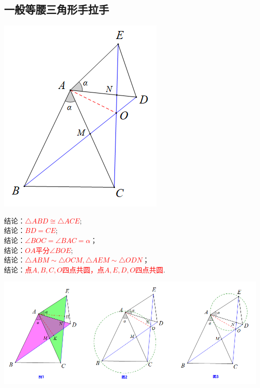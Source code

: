 \documentclass[10pt]{ctexart}
\begin{document}
\subsection{一般等腰三角形手拉手}
\begin{minipage}{0.4\textwidth}
\includegraphics[scale=0.6]{figure/shoulashou01}
\end{minipage}
\begin{minipage}{0.6\textwidth}
  结论：\textcolor{red}{$\triangle ABD\cong \triangle ACE$};\\
  结论：\textcolor{red}{$BD=CE$};\\
  结论：\textcolor{red}{$\angle BOC=\angle BAC=\alpha$}；\\
  结论：\textcolor{red}{$OA$平分$\angle BOE$};\\
  结论：\textcolor{red}{$\triangle ABM\sim \triangle OCM,\triangle AEM\sim \triangle ODN$}；\\
   结论：\textcolor{red}{点$A,B,C,O$四点共圆，点$A,E,D,O$四点共圆}.
\end{minipage}
\includegraphics[scale=0.6]{figure/shoulashou02}
\end{document}
